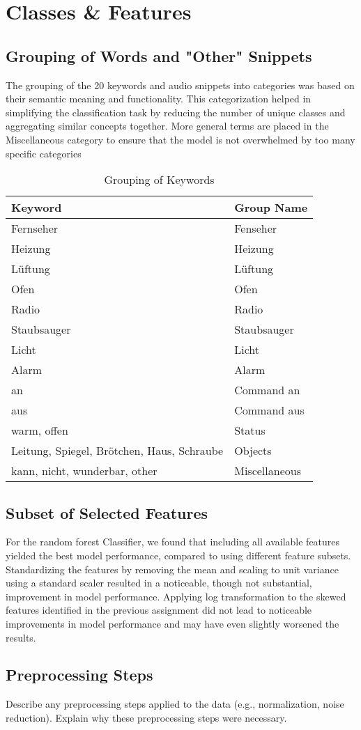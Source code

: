 \section{Classes \& Features}

\subsection{Grouping of Words and "Other" Snippets}
The grouping of the 20 keywords and audio snippets into categories was based on their semantic meaning and functionality. This categorization helped in simplifying the classification task by reducing the number of unique classes and aggregating similar concepts together.
More general terms are placed in the Miscellaneous category to ensure that the model is not overwhelmed by too many specific categories

\begin{table}
  \caption{Grouping of Keywords}
  \label{tab:keyword_grouping}
  \centering
  \begin{tabular}{ll}
    \toprule
    Keyword & Group Name \\
    \midrule
    Fernseher & Fenseher \\
    Heizung & Heizung \\
    Lüftung & Lüftung \\
    Ofen & Ofen \\
    Radio & Radio \\
    Staubsauger & Staubsauger \\
    Licht & Licht \\
    Alarm & Alarm \\
    an & Command an \\
    aus & Command aus \\
    warm, offen & Status \\
    Leitung, Spiegel, Brötchen, Haus, Schraube & Objects \\
    kann, nicht, wunderbar, other & Miscellaneous \\
    \bottomrule
  \end{tabular}
\end{table}

\subsection{Subset of Selected Features}
For the random forest Classifier, we found that including all available features yielded the best model performance, compared to using different feature subsets.
Standardizing the features by removing the mean and scaling to unit variance using a standard scaler resulted in a noticeable, though not substantial, improvement in model performance.
Applying log transformation to the skewed features identified in the previous assignment did not lead to noticeable improvements in model performance and may have even slightly worsened the results.

\subsection{Preprocessing Steps}
Describe any preprocessing steps applied to the data (e.g., normalization, noise reduction). Explain why these preprocessing steps were necessary.
